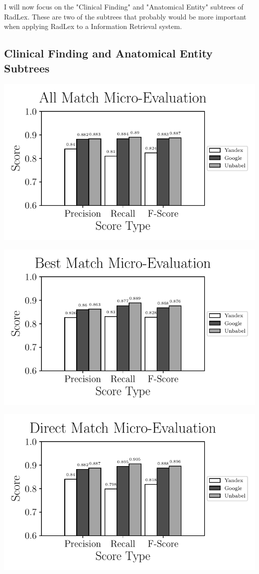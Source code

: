 I will now focus on the "Clinical Finding" and "Anatomical Entity" subtrees of RadLex. These are two of the subtrees that probably would be more important when applying RadLex to a Information Retrieval system. 

\subsection{Clinical Finding and Anatomical Entity Subtrees}

\includegraphics{SupportFiles/plots/all_match_micro_clinical_anatomical_subtrees_plot.pdf}

\includegraphics{SupportFiles/plots/best_match_micro_clinical_anatomical_subtrees_plot.pdf}

\includegraphics{SupportFiles/plots/direct_match_micro_clinical_anatomical_subtrees_plot.pdf}

